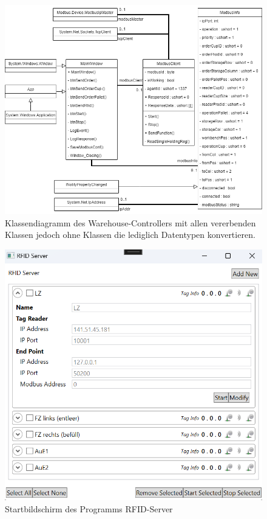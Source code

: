     \begin{figure}[ht]
        \label{fig:figure6}
        \includegraphics[width = \textwidth ]{Bilder/C_Klassendiagramm}
        \caption[Klassendiagramm des Controllers ]
        {\small Klassendiagramm des Warehouse-Controllers mit allen vererbenden Klassen jedoch ohne Klassen die
        lediglich Datentypen konvertieren.}
        \centering
    \end{figure}

    \begin{figure}[ht]
        \label{fig:figure7}
        \includegraphics[height = \textwidth ]{Bilder/RFIDServer_Bildschirm}
        \caption[Startbildschirm des Programms RFID-Server]
        {\small Startbildschirm des Programms RFID-Server}
        \centering
    \end{figure}

